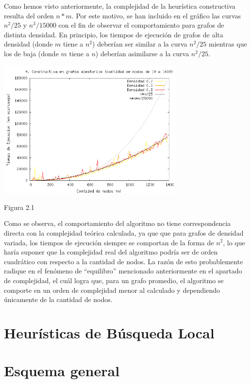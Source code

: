 \documentclass[a4paper,11pt] {article}
\begin{document}
Como hemos visto anteriormente, la complejidad de la heurística constructiva resulta del orden $n*m$. Por este motivo, se han incluido en el gráfico las curvas $n^2/25$ y $n^3/15000$ con el fin de observar el comportamiento para grafos de distinta densidad. En principio, los tiempos de ejecución de grafos de alta densidad (donde $m$ tiene a $n^2$) deberían ser similar a la curva $n^2/25$ mientras que los de baja (donde $m$ tiene a $n$) deberían asimilarse a la curva $n^2/25$.

\begin{center}
 \includegraphics[width=0.7\textwidth]{graficos/tiemposHC.png}
\begin{center}
Figura 2.1
\end{center}
\end{center}

Como se observa, el comportamiento del algoritmo no tiene correspondencia directa con la complejidad teórica calculada, ya que que para grafos de densidad variada, los tiempos de ejecución siempre se comportan de la forma de $n^2$, lo que haría suponer que la complejidad real del algoritmo podría ser de orden cuadrático con respecto a la cantidad de nodos. La razón de esto probablemente radique en el fenómeno de ``equilibro'' mencionado anteriormente en el apartado de complejidad, el cuál logra que, para un grafo promedio, el algoritmo se comporte en un orden de complejidad menor al calculado y dependiendo únicamente de la cantidad de nodos.

\bigskip
\section{Heur\'isticas de B\'usqueda Local}

\section*{Esquema general}
\end{document}
